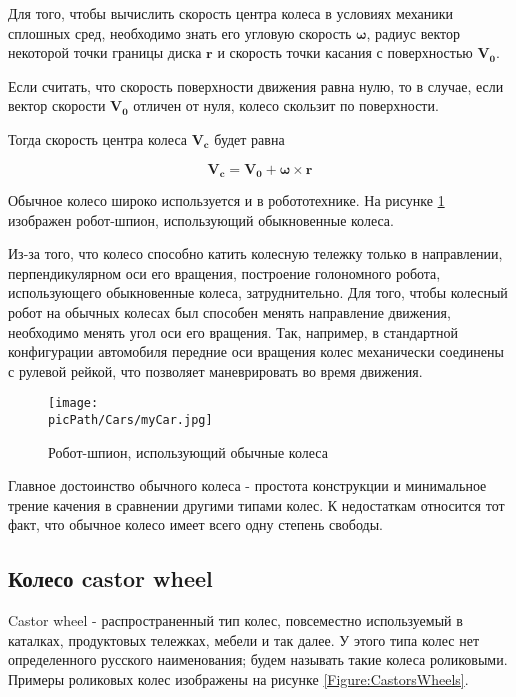 \documentclass[oneside,final,14pt]{extreport}
\newcommand{\picPath}{img}
\newcommand{\cmmnt}[1]{\ignorespaces}
\newcommand{\bs}{\boldsymbol}
\begin{document}
Для того, чтобы вычислить скорость центра колеса в условиях механики сплошных сред, необходимо знать его угловую скорость $\bs{\omega}$, радиус вектор некоторой точки границы диска $\bs{r}$ и скорость точки касания с поверхностью $\bs{V_{0}}$.

Если считать, что скорость поверхности движения равна нулю, то в случае, если вектор скорости $\bs{V_{0}}$ отличен от нуля, колесо скользит по поверхности. 

Тогда скорость центра колеса $\bs{V_{c}}$ будет равна

\begin{equation}
\bs{V_{c}}
=
\bs{V_{0}}
+
\bs{\omega}
\times
\bs{r}
\label{Equation:wheelSpeed}
\end{equation}

Обычное колесо широко используется и в робототехнике. На рисунке \ref{Figure:myCar} изображен робот-шпион, использующий обыкновенные колеса. 

Из-за того, что  колесо способно катить колесную тележку только в направлении, перпендикулярном оси его вращения, построение голономного робота, использующего обыкновенные колеса, затруднительно. Для того, чтобы колесный робот на обычных колесах был способен менять направление движения, необходимо менять угол оси его вращения. Так, например, в стандартной конфигурации автомобиля передние оси вращения колес механически соединены с рулевой рейкой, что позволяет маневрировать во время движения.  
\begin{figure}[H]
\begin{center}
\texttt{[image: \\picPath/Cars/myCar.jpg]}
\end{center}
  \caption{ Робот-шпион, использующий обычные колеса}
  \label{Figure:myCar}
\end{figure}
Главное достоинство обычного колеса - простота конструкции и минимальное трение качения в сравнении другими типами колес. К недостаткам относится тот факт, что обычное колесо имеет всего одну степень свободы. \cmmnt{движение обычного колеса возможно только в направлениях, перпендикулярных оси вращения.}
\subsection{Колесо castor wheel}
Castor wheel - распространенный тип колес, повсеместно используемый в каталках, продуктовых тележках, мебели и так далее. У этого типа колес нет определенного русского наименования; будем называть такие колеса роликовыми. Примеры роликовых колес изображены на рисунке \ref{Figure:CastorsWheels}.
\end{document}
